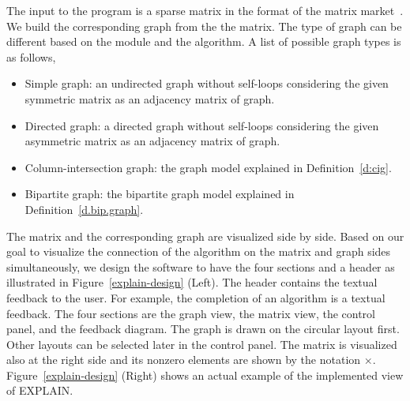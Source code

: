 \documentclass[12pt, twoside,a4paper,toc=bibliography]{scrbook}
\newcommand{\figref}[1]{Figure~\protect\ref{#1}}
\newcommand{\defref}[1]{Definition~\protect\ref{#1}}
\begin{document}
The input to the program is a sparse matrix in the format of the matrix market~\cite{matrix-market}.
We build the corresponding graph from the the matrix.
The type of graph can be different based on the module and the algorithm.
A list of possible graph types is as follows,
\begin{itemize}
\item Simple graph: an undirected graph without self-loops considering 
the given symmetric matrix as an adjacency matrix of graph.
\item Directed graph: a directed graph without self-loops considering
the given asymmetric matrix as an adjacency matrix of graph.
\item Column-intersection graph: the graph model explained in \defref{d:cig}.
\item Bipartite graph: the bipartite graph model explained in \defref{d.bip.graph}.
\end{itemize}
The matrix and the corresponding graph are visualized side by side.
Based on our goal to visualize the connection of the algorithm on the matrix and graph sides simultaneously,
we design the software to have the four sections and a header as illustrated in \figref{explain-design} (Left).
The header contains the textual feedback to the user. For example, the completion of an algorithm is a textual feedback. 
The four sections are the graph view, the matrix view, the control panel, and the feedback diagram.
The graph is drawn on the circular layout first. Other layouts can be selected later
in the control panel. The matrix is visualized also at the right side and
its nonzero elements are shown by the notation $\times$.
\figref{explain-design} (Right) shows an actual example of the implemented view of
\mbox{EXPLAIN}.
\end{document}
